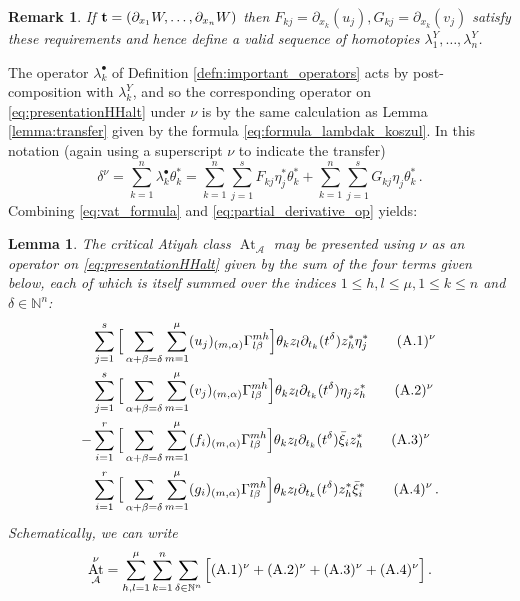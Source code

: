 \documentclass[english,letter paper,12pt,leqno]{article}
\newtheorem{lemma}[theorem]{Lemma}
\theoremstyle{example}
\newtheorem{remark}[theorem]{Remark}
\numberwithin{equation}{section}
\def\AA{\mathcal{A}}
\def\be{\begin{equation}}
\def\ee{\end{equation}}
\DeclareMathOperator{\vAt}{At}
\begin{document}
\begin{remark}\label{remark:default_homotopies}
If $\bold{t} = (\partial_{x_1} W, \ldots, \partial_{x_n} W)$ then $F_{kj} = \partial_{x_k}(u_j), G_{kj} = \partial_{x_k}(v_j)$ satisfy these requirements and hence define a valid sequence of homotopies $\lambda^Y_1,\ldots,\lambda^Y_n$.
\end{remark}

The operator $\lambda_k^\bullet$ of Definition \ref{defn:important_operators} acts by post-composition with $\lambda^Y_k$, and so the corresponding operator on \eqref{eq:presentationHHalt} under $\nu$ is by the same calculation as Lemma \ref{lemma:transfer} given by the formula \eqref{eq:formula_lambdak_koszul}. In this notation (again using a superscript $\nu$ to indicate the transfer)
\be\label{eq:delta_formula}
\delta^\nu = \sum_{k=1}^n \lambda^\bullet_k \theta_k^* = \sum_{k=1}^n \sum_{j=1}^s F_{kj} \eta_j^* \theta_k^* + \sum_{k=1}^n \sum_{j=1}^s G_{kj} \eta_j \theta_k^*\,.
\ee
Combining \eqref{eq:vat_formula} and \eqref{eq:partial_derivative_op} yields:

\begin{lemma}
The critical Atiyah class $\vAt_{\AA}$ may be presented using $\nu$ as an operator on \eqref{eq:presentationHHalt} given by the sum of the four terms given below, each of which is itself summed over the indices $1 \le h,l \le \mu, 1 \le k \le n$ and $\delta \in \mathbb{N}^n$:
\begin{align}
& \sum_{j=1}^s \Big[ \sum_{\alpha + \beta = \delta } \sum_{m=1}^\mu (u_j)_{(m,\alpha)} \Gamma^{m h}_{l \beta} \Big] \theta_k z_{l} \partial_{t_k}(t^\delta) z_h^* \eta_j^*  \qquad (\textup{A}.1)^{\nu} \label{eq:a1vertex}\\
& \sum_{j=1}^s \Big[ \sum_{\alpha + \beta = \delta } \sum_{m=1}^\mu (v_j)_{(m,\alpha)} \Gamma^{mh}_{l\beta} \Big] \theta_k z_l \partial_{t_k}(t^\delta) \eta_j z_h^*  \qquad (\textup{A}.2)^{\nu} \label{eq:a2vertex}\\
-&\sum_{i=1}^r \Big[ \sum_{\alpha + \beta = \delta } \sum_{m=1}^\mu (f_i)_{(m,\alpha)} \Gamma^{mh}_{l\beta} \Big] \theta_k z_l \partial_{t_k}(t^\delta) \Bar{\xi}_i z_h^*  \qquad (\textup{A}.3)^{\nu} \label{eq:a3vertex}\\
&\sum_{i=1}^r \Big[ \sum_{\alpha + \beta = \delta } \sum_{m=1}^\mu (g_i)_{(m,\alpha)} \Gamma^{mh}_{l\beta} \Big] \theta_k z_l \partial_{t_k}(t^\delta) z_h^* \Bar{\xi}_i^* \qquad (\textup{A}.4)^{\nu}\,. \label{eq:a4vertex}
\end{align}
Schematically, we can write
\be
\vAt^\nu_{\AA} = \sum_{h,l=1}^\mu \sum_{k=1}^n\sum_{\delta \in \mathbb{N}^n} \Big[ (\textup{A}.1)^{\nu} + (\textup{A}.2)^{\nu} + (\textup{A}.3)^{\nu} + (\textup{A}.4)^{\nu} \Big]\,.
\ee
\end{lemma}
\end{document}
